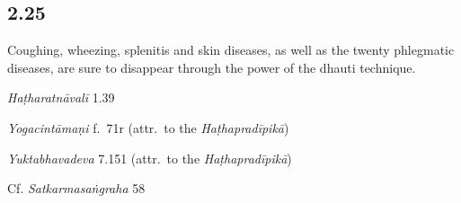 \begin{ekdosis}
\subsection*{2.25}
\begin{translation}[hp02_025]
Coughing, wheezing, splenitis and skin diseases, as well as the twenty phlegmatic diseases, are sure to disappear through the power of the dhauti technique.
\end{translation}

\begin{sources}[hp02_025]
\end{sources}

\begin{testimonia}[hp02_025]
\emph{Haṭharatnāvalī} 1.39

\begin{versinnote}
\end{versinnote}

\emph{Yogacintāmaṇi} f.~71r (attr.~to the \emph{Haṭhapradīpikā})

\begin{versinnote}
\end{versinnote}

\emph{Yuktabhavadeva} 7.151 (attr.~to the \emph{Haṭhapradīpikā})

\begin{versinnote}
\end{versinnote}

Cf. \emph{Satkarmasaṅgraha} 58

\begin{versinnote}
\end{versinnote}


\end{testimonia}
\end{ekdosis}
